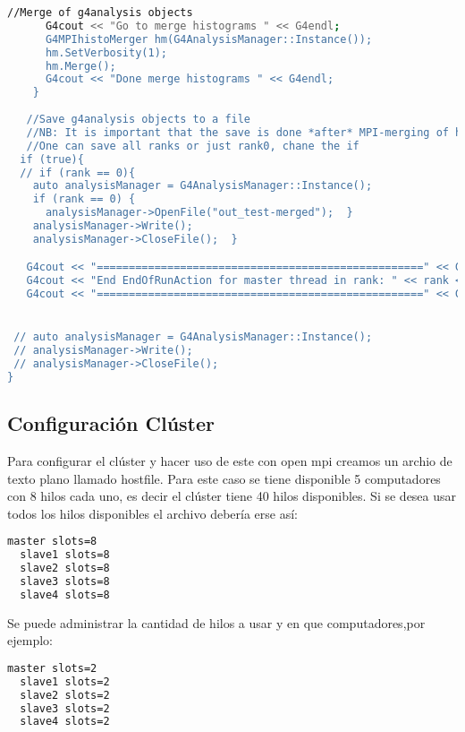 \begin{enumerate}
\begin{lstlisting}[language=bash,style=mystyle]
      //Merge of g4analysis objects
      G4cout << "Go to merge histograms " << G4endl;
      G4MPIhistoMerger hm(G4AnalysisManager::Instance());
      hm.SetVerbosity(1);
      hm.Merge();
      G4cout << "Done merge histograms " << G4endl;
    }
 
   //Save g4analysis objects to a file
   //NB: It is important that the save is done *after* MPI-merging of histograms
   //One can save all ranks or just rank0, chane the if  
  if (true){  
  // if (rank == 0){
    auto analysisManager = G4AnalysisManager::Instance();
    if (rank == 0) {
      analysisManager->OpenFile("out_test-merged");  }
    analysisManager->Write();
    analysisManager->CloseFile();  }

   G4cout << "===================================================" << G4endl;
   G4cout << "End EndOfRunAction for master thread in rank: " << rank << G4endl;
   G4cout << "===================================================" << G4endl;


 // auto analysisManager = G4AnalysisManager::Instance();
 // analysisManager->Write();
 // analysisManager->CloseFile();
}
\end{lstlisting}



\end{enumerate}


\subsection{Configuración Clúster}

Para configurar el clúster y hacer uso de este con open mpi creamos un archio de texto plano llamado hostfile. Para este caso se tiene disponible 5 computadores con 8 hilos cada uno, es decir el clúster tiene 40 hilos disponibles. Si se desea usar todos los hilos disponibles el archivo debería erse así:

\begin{lstlisting}[language=bash,style=mystyle]
  master slots=8
  slave1 slots=8
  slave2 slots=8
  slave3 slots=8
  slave4 slots=8
\end{lstlisting}

Se puede administrar la cantidad de hilos a usar y en que computadores,por ejemplo:

\begin{lstlisting}[language=bash,style=mystyle]
  master slots=2
  slave1 slots=2
  slave2 slots=2
  slave3 slots=2
  slave4 slots=2
\end{lstlisting}

